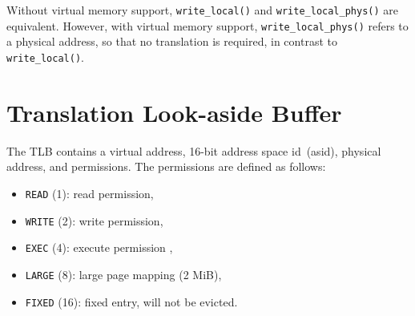 Without virtual memory support, \texttt{write\_local()} and \texttt{write\_local\_phys()} are
equivalent. However, with virtual memory support, \texttt{write\_local\_phys()} refers to a physical
address, so that no translation is required, in contrast to \texttt{write\_local()}.

\section{Translation Look-aside Buffer}
\label{sec:tlb}

The TLB contains a virtual address, 16-bit address space id~(asid), physical address, and
permissions. The permissions are defined as follows:

\begin{itemize}
  \item \texttt{READ} (1): read permission,
  \item \texttt{WRITE} (2): write permission,
  \item \texttt{EXEC} (4): execute permission ,
  \item \texttt{LARGE} (8): large page mapping (2 MiB),
  \item \texttt{FIXED} (16): fixed entry, will not be evicted.
\end{itemize}
\extend{}
